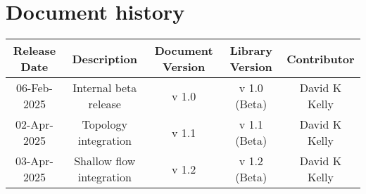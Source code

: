 \documentclass{article}
\begin{document}
\section{Document history}
\begin{table}[ht]
    \centering
    \begin{tabular}{c|c|c|c|c}
        Release Date & Description & Document Version & Library Version & Contributor\\
        \hline
        06-Feb-2025 & Internal beta release & v 1.0 & v 1.0 (Beta) & David K Kelly\\
        02-Apr-2025 & Topology integration & v 1.1 & v 1.1 (Beta) & David K Kelly\\
        03-Apr-2025 & Shallow flow integration & v 1.2 & v 1.2 (Beta) & David K Kelly\\
    \end{tabular}
    \label{tab:revision_history}
\end{table}

\clearpage
\end{document}
